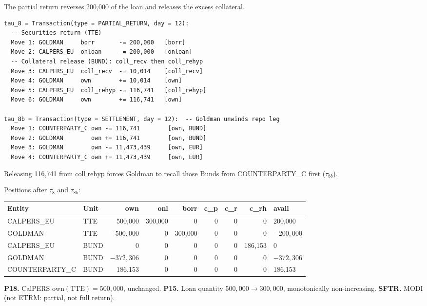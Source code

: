 The partial return reverses 200{,}000 of the loan and releases the excess collateral.

\begin{lstlisting}
tau_8 = Transaction(type = PARTIAL_RETURN, day = 12):
  -- Securities return (TTE)
  Move 1: GOLDMAN     borr       -= 200,000   [borr]
  Move 2: CALPERS_EU  onloan     -= 200,000   [onloan]
  -- Collateral release (BUND): coll_recv then coll_rehyp
  Move 3: CALPERS_EU  coll_recv  -= 10,014    [coll_recv]
  Move 4: GOLDMAN     own        += 10,014    [own]
  Move 5: CALPERS_EU  coll_rehyp -= 116,741   [coll_rehyp]
  Move 6: GOLDMAN     own        += 116,741   [own]

tau_8b = Transaction(type = SETTLEMENT, day = 12):  -- Goldman unwinds repo leg
  Move 1: COUNTERPARTY_C own -= 116,741        [own, BUND]
  Move 2: GOLDMAN        own += 116,741        [own, BUND]
  Move 3: GOLDMAN        own -= 11,473,439     [own, EUR]
  Move 4: COUNTERPARTY_C own += 11,473,439     [own, EUR]
\end{lstlisting}

\noindent Releasing 116{,}741 from $\mathrm{coll\_rehyp}$ forces Goldman to recall those Bunds from COUNTERPARTY\_C first ($\tau_{8b}$).

Positions after $\tau_8$ and $\tau_{8b}$:

\begin{center}\small
\begin{tabular}{l l r r r r r r l}
\toprule
\textbf{Entity} & \textbf{Unit} & own & onl & borr & c\_p & c\_r & c\_rh & avail \\
\midrule
CALPERS\_EU & TTE & 500{,}000 & 300{,}000 & 0 & 0 & 0 & 0 & 200{,}000 \\
GOLDMAN & TTE & $-500{,}000$ & 0 & 300{,}000 & 0 & 0 & 0 & $-200{,}000$ \\
CALPERS\_EU & BUND & 0 & 0 & 0 & 0 & 0 & 186{,}153 & 0 \\
GOLDMAN & BUND & $-372{,}306$ & 0 & 0 & 0 & 0 & 0 & $-372{,}306$ \\
COUNTERPARTY\_C & BUND & 186{,}153 & 0 & 0 & 0 & 0 & 0 & 186{,}153 \\
\bottomrule
\end{tabular}
\end{center}

\noindent\textbf{P18.} CalPERS $\mathrm{own}(\text{TTE}) = 500{,}000$, unchanged. \checkmark\quad
\textbf{P15.} Loan quantity $500{,}000 \to 300{,}000$, monotonically non-increasing. \checkmark\quad
\textbf{SFTR.} MODI (not ETRM: partial, not full return).

